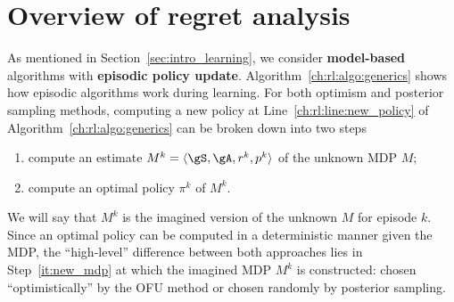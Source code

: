 \section{Overview of regret analysis}

As mentioned in Section~\ref{sec:intro_learning}, we consider \textbf{model-based} algorithms with \textbf{episodic policy update}.
Algorithm~\ref{ch:rl:algo:generics} shows how episodic algorithms work during learning.
For both optimism and posterior sampling methods, computing a new policy at Line~\ref{ch:rl:line:new_policy} of Algorithm~\ref{ch:rl:algo:generics} can be broken down into two steps
\begin{enumerate}[label=(\roman*)]
    \item \label{it:new_mdp} compute an estimate $M^k=\langle\gS,\gA,r^k,p^k\rangle$ of the unknown MDP $M$;
    \item compute an optimal policy $\pi^k$ of $M^k$.
\end{enumerate}
We will say that $M^k$ is the imagined version of the unknown $M$ for episode $k$.
Since an optimal policy can be computed in a deterministic manner given the MDP, the ``high-level'' difference between both approaches lies in Step~\ref{it:new_mdp} at which the imagined MDP $M^k$ is constructed: chosen ``optimistically'' by the OFU method or chosen randomly by posterior sampling.


